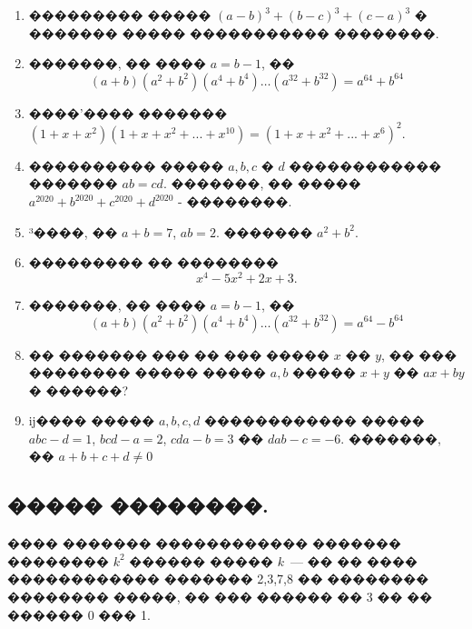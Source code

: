 \documentclass[a4paper,12pt]{article}
\begin{document}
\begin{enumerate}
\item ��������� ����� $(a-b)^{3}+(b-c)^{3}+(c-a)^{3}$ � ������� ����� ����������� ��������.

\item �������, �� ���� $a=b-1$, �� $$(a+b)(a^{2}+b^{2})(a^{4}+b^{4})\ldots (a^{32}+b^{32})=a^{64}+b^{64}$$


\item ����'���� ������� $(1+x+x^{2})(1+x+x^{2}+...+x^{10})=(1+x+x^{2}+...+x^{6})^{2}.$

\item ���������� ����� $a, b, c$ � $d$ ������������ ������� $ab=cd$. �������, �� ����� $a^{2020}+b^{2020}+c^{2020}+d^{2020}$ - ��������.

\item ³����, �� $a+b=7$, $ab=2$. ������� $a^{2}+b^{2}$.

\item ��������� �� �������� $$x^{4}-5x^{2}+2x+3.$$

\item �������, �� ���� $a=b-1$, �� $$(a+b)(a^{2}+b^{2})(a^{4}+b^{4})\ldots (a^{32}+b^{32})=a^{64}-b^{64}$$

\item �� ������� ��� �� ��� ����� $x$ �� $y$, �� ��� �������� ����� ����� $a,b$ ����� $x+y$ �� $ax+by$ � ������?

\item ĳ���� ����� $a,b,c,d$ ������������ ����� $abc-d=1$, $bcd-a=2$, $cda-b=3$ �� $dab-c=-6$. �������, �� $a+b+c+d\neq 0$
\end{enumerate}







\newpage

\begin{center}
\section*{����� ��������.}
\end{center}

���� ������� ������������ ������� �������� $k^{2}$ ������ ����� $k$~--- �� �� ���� ������������ ������� 2,3,7,8 �� �������� �������� �����, �� ��� ������ �� 3 �� �� ������ 0 ��� 1.

\medskip\medskip\medskip
\end{document}
